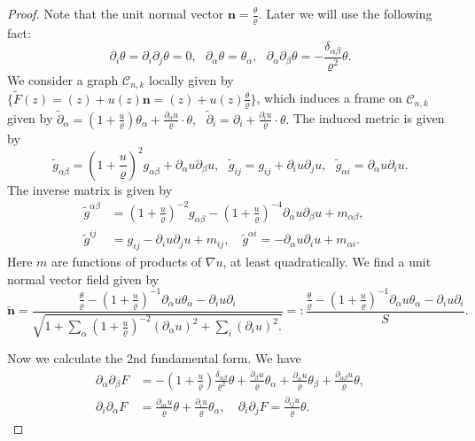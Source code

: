 \documentclass[11pt]{amsart}
\numberwithin{equation}{section}
\numberwithin{equation}{section}
\newcommand{\bn}{\mathbf{n}}
\newcommand{\cC}{\mathcal{C}}
\newcommand{\pr}{\partial}
\begin{document}
	\begin{proof}
		
		Note that the unit normal vector $\bn=\frac{\theta}{\varrho}$. Later we will use the following fact:
		\[\pr_i \theta=\pr_i\pr_j\theta=0,\ \ \ 
		\pr_\alpha\theta=\theta_\alpha,\ \ \ \pr_{\alpha}\pr_{\beta} \theta = -\frac{\delta_{\alpha\beta}}{\varrho^2}\theta.
		\]
		We consider a graph $\cC_{n,k}$ locally given by $\{\widetilde{F}(z)=(z)+u(z)\bn= (z)+u(z)\frac{\theta}{\varrho}\}$, which induces a frame on $\cC_{n,k}$ given by
		$
		\widetilde{\pr}_\alpha=(1+\frac{u}{\varrho})\theta_{\alpha}+\frac{\pr_\alpha u}{\varrho} \cdot\theta,\ \ \ 
		\widetilde{\pr}_{i}=\pr_i +\frac{\pr_iu}{\varrho} \cdot \theta.
		$
		The induced metric is given by
		\begin{equation*}
			\widetilde{g}_{\alpha\beta}=(1+\frac{u}{\varrho})^2 g_{\alpha\beta} + \pr_\alpha u \pr_\beta u
			,
			\ \ \ 
			\widetilde{g}_{i j}
			=
			g_{ij}+\pr_i u\pr_j u
			,
			\ \ \ 
			\widetilde{g}_{\alpha i}
			=
			\pr_{\alpha} u \pr_i u.
		\end{equation*}
		The inverse matrix is given by
		\begin{equation*}
			\begin{aligned}
				\widetilde{g}^{\alpha\beta}
				&=
				(1+\frac{u}{\varrho})^{-2}g_{\alpha\beta} - (1+\frac{u}{\varrho})^{-4}\pr_\alpha u \pr_\beta u+ m_{\alpha\beta},
				\quad	\\
				\widetilde{g}^{i j}
				&=
				g_{ij} - \pr_i u\pr_j u 
				+ m_{ij},\quad 
				\widetilde{g}^{\alpha i}
				=
				-\pr_\alpha u\pr_i u
				+ m_{\alpha i}.
			\end{aligned}
		\end{equation*}
		Here $m$ are functions of products of $\nabla u$, at least quadratically.	We find a unit normal vector field given by
		\begin{equation*}
			\widetilde{\bn}
			=
			\frac{\frac{\theta}{\varrho}-(1+\frac{u}{\varrho})^{-1}\pr_\alpha u\theta_{\alpha} -\pr_i u \pr_i}
			{\sqrt{
					1+\sum_{\alpha}(1+\frac{u}{\varrho})^{-2}(\pr_\alpha u)^2	
					+\sum_i (\pr_i u)^2.
			}}
			=:
			\frac{\frac{\theta}{\varrho}-(1+\frac{u}{\varrho})^{-1}\pr_\alpha u\theta_{\alpha} -\pr_i u \pr_i}{S}.
		\end{equation*}
		
		Now we calculate the 2nd fundamental form. We have
		\begin{equation*}
			\begin{aligned}
				\pr_{\alpha}\pr_{\beta} F
				&=
				-(1+\frac{u}{\varrho})\frac{\delta_{\alpha\beta}}{\varrho^2}\theta
				+
				\frac{\pr_{\beta} u}{\varrho}\theta_{\alpha}
				+
				\frac{\pr_{\alpha }u}{\varrho}\theta_\beta
				+
				\frac{\pr_{\alpha\beta}u}{\varrho}\theta,
				\\
				\pr_i\pr_{\alpha} F
				&	=
				\frac{\pr_{i\alpha} u}{\varrho}\theta
				+\frac{\pr_i u}{\varrho}\theta_{\alpha},
				\quad		\pr_i\pr_j F
				=
				\frac{\pr_{ij}u}{\varrho}\theta.
			\end{aligned}
		\end{equation*}
		

\end{proof}
\end{document}
